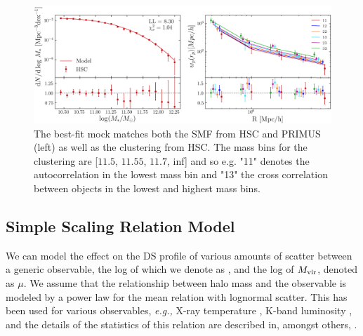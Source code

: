\documentclass[a4paper,fleqn,usenatbib]{mnras}
\begin{document}
\begin{figure}
  \centering
  \includegraphics[width=\textwidth]{figure/mock_placeholder}
  \caption{ The best-fit mock matches both the SMF from HSC and PRIMUS (left)
    as well as the clustering from HSC. The mass bins for the clustering are [$11.5$, $11.55$,
    $11.7$, inf] and so e.g. "11" denotes the autocorrelation in the lowest mass bin and "13" the
    cross correlation between objects in the lowest and highest mass bins.}
  \label{fig:best_mock}
\end{figure}


\subsection{Simple Scaling Relation Model}
    \label{sec:scaling}

We can model the effect on the DS profile of various amounts of scatter between a generic
observable, the log of which we denote as \obsSym{}, and the log of $M_{\rm vir}$, denoted as $\mu$.
We assume that the relationship between halo mass and the observable is modeled by a power law
for the mean relation with lognormal scatter. This has been used for various observables, {\it
e.g.,\/} X-ray temperature \citet{Lieu2016}, K-band luminosity \citet{Ziparo2016}, and the
details of the statistics of this relation are described in, amongst others, \citet{Evrard2014,
Farahi2018}.
\end{document}
